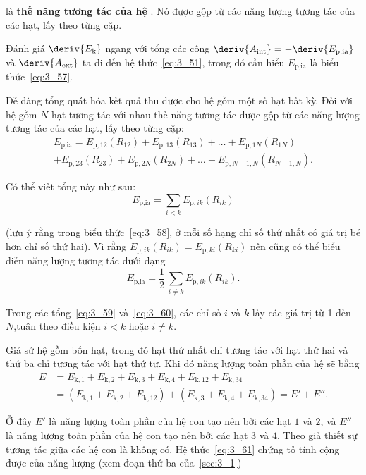 \noindent
là \textbf{thế năng tương tác của hệ }. Nó được gộp từ các năng lượng tương tác của các hạt, lấy theo từng cặp. 

Đánh giá $\deriv{E_{\text{k}}}$ ngang với tổng các công $\deriv{A_{\text{int}}}=-\deriv{E_{\text{p,ia}}}$ và $\deriv{A_{\text{ext}}}$ ta đi đến hệ thức~\eqref{eq:3_51}, trong đó cần hiểu $E_{\text{p,ia}}$ là biểu thức~\eqref{eq:3_57}.

Dễ dàng tổng quát hóa kết quả thu được cho hệ gồm một số hạt bất kỳ. Đối với hệ gồm $N$ hạt tương tác với nhau thế năng tương tác được gộp từ các năng lượng tương tác của các hạt, lấy theo từng cặp:
\begin{multline}\label{eq:3_58}
E_{\text{p,ia}} = E_{\text{p},12}(R_{12}) + E_{\text{p},13}(R_{13}) + \ldots + E_{\text{p},1N}(R_{1N})\\
+ E_{\text{p},23}(R_{23}) + E_{\text{p},2N}(R_{2N}) + \ldots + E_{\text{p},N-1,N}(R_{N-1,N}).
\end{multline}

\noindent 
Có thể viết tổng  này như sau: 
\begin{equation}\label{eq:3_59}
E_{\text{p,ia}} = \sum_{i<k} E_{\text{p},ik}(R_{ik})
\end{equation}

\noindent 
(lưu ý rằng trong biểu thức~\eqref{eq:3_58}, ở mỗi số hạng chỉ số thứ nhất có giá trị bé hơn chỉ số thứ hai). Vì rằng $E_{\text{p},ik}(R_{ik})=E_{\text{p},ki}(R_{ki})$ nên cũng có thể biểu diễn năng lượng tương tác dưới dạng 
\begin{equation}\label{eq:3_60}
E_{\text{p,ia}} = \frac{1}{2}\,\sum_{i\neq k} E_{\text{p},ik}(R_{ik}).
\end{equation}

\noindent
Trong các tổng~\eqref{eq:3_59} và~\eqref{eq:3_60}, các chỉ số $i$ và $k$ lấy các giá trị từ 1 đến $N$,tuân theo điều kiện $i<k$ hoặc $i\neq k$.

Giả sử hệ gồm bốn hạt, trong đó hạt thứ nhất chỉ tương tác với hạt thứ hai và thứ ba chỉ tương tác với hạt thứ tư. Khi đó năng lượng toàn phần của hệ sẽ bằng 
\begin{align}
E &= E_{\text{k},1} + E_{\text{k},2} + E_{\text{k},3} + E_{\text{k},4} + E_{\text{k},12} + E_{\text{k},34}\nonumber\\
&= (E_{\text{k},1} + E_{\text{k},2} + E_{\text{k},12}) + (E_{\text{k},3} + E_{\text{k},4} + E_{\text{k},34}) = E' + E''. \label{eq:3_61}
\end{align}

\noindent
Ở đây $E'$ là năng lượng toàn phần của hệ con tạo nên bởi các hạt $1$ và $2$, và $E''$ là năng lượng toàn phần của hệ con tạo nên bởi các hạt $3$ và $4$. Theo giả thiết sự tương tác giữa các hệ con là không có. Hệ thức~\eqref{eq:3_61} chứng tỏ tính cộng được của năng lượng (xem đoạn thứ ba của~\ref{sec:3_1})

